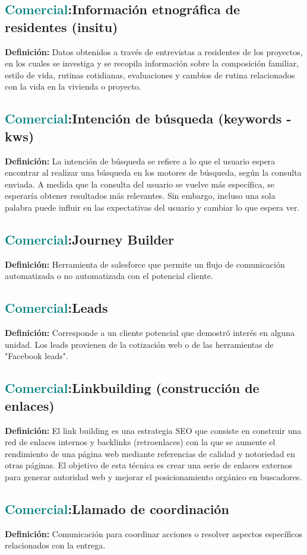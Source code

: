 \documentclass[12pt]{article}
\begin{document}
\subsection{\textcolor{teal}{Comercial}:{Información etnográfica de residentes (insitu)}}
\textbf{Definición:} Datos obtenidos a través de entrevistas a residentes de los proyectos, en los cuales se investiga y se recopila información sobre la composición familiar, estilo de vida, rutinas cotidianas, evaluaciones y cambios de rutina relacionados con la vida en la vivienda o proyecto.
\subsection{\textcolor{teal}{Comercial}:{Intención de búsqueda (keywords - kws)}}
\textbf{Definición:} La intención de búsqueda se refiere a lo que el usuario espera encontrar al realizar una búsqueda en los motores de búsqueda, según la consulta enviada. A medida que la consulta del usuario se vuelve más específica, se esperaría obtener resultados más relevantes. Sin embargo, incluso una sola palabra puede influir en las expectativas del usuario y cambiar lo que espera ver.
\subsection{\textcolor{teal}{Comercial}:{Journey Builder}}
\textbf{Definición:} Herramienta de salesforce que permite un flujo de comunicación automatizada o no automatizada con el potencial cliente.
\subsection{\textcolor{teal}{Comercial}:{Leads}}
\textbf{Definición:} Corresponde a un cliente potencial que demostró interés en alguna unidad. Los leads provienen de la cotización web o de las herramientas de "Facebook leads". 
\subsection{\textcolor{teal}{Comercial}:{Linkbuilding (construcción de enlaces)}}
\textbf{Definición:} El link building es una estrategia SEO que consiste en construir una red de enlaces internos y backlinks (retroenlaces) con la que se aumente el rendimiento de una página web mediante referencias de calidad y notoriedad en otras páginas. El objetivo de esta técnica es crear una serie de enlaces externos para generar autoridad web y mejorar el posicionamiento orgánico en buscadores.
\subsection{\textcolor{teal}{Comercial}:{Llamado de coordinación}}
\textbf{Definición:} Comunicación para coordinar acciones o resolver aspectos específicos relacionados con la entrega.
\end{document}
